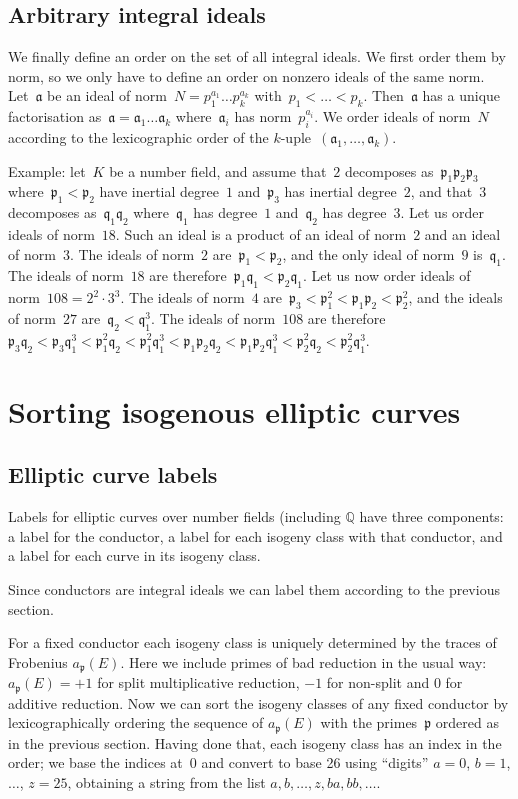 \documentclass{article}
\def\Q{{\mathbb Q}}
\def\a{{\mathfrak a}}
\def\p{{\mathfrak p}}
\def\q{{\mathfrak q}}
\begin{document}
\subsection{Arbitrary integral ideals}

We finally define an order on the set of all integral ideals. We first order
them by norm, so we only have to define an order on nonzero ideals of the same
norm. Let~$\a$ be an ideal of norm~$N = p_1^{a_1}\dots p_k^{a_k}$ with~$p_1 <
\dots < p_k$. Then~$\a$ has a unique factorisation as~$\a = \a_1\dots\a_k$
where~$\a_i$ has norm~$p_i^{a_i}$. We order ideals of norm~$N$ according to the
lexicographic order of the $k$-uple~$(\a_1,\dots,\a_k)$.

Example: let~$K$ be a number field, and assume that~$2$ decomposes
as~$\p_1\p_2\p_3$ where~$\p_1<\p_2$ have inertial degree~$1$ and~$\p_3$ has
inertial degree~$2$, and that~$3$ decomposes as~$\q_1\q_2$ where~$\q_1$ has
degree~$1$ and~$\q_2$ has degree~$3$. Let us order ideals of norm~$18$. Such an
ideal is a product of an ideal of norm~$2$ and an ideal of norm~$3$. The ideals
of norm~$2$ are~$\p_1 < \p_2$, and the only ideal of norm~$9$ is~$\q_1$. The
ideals of norm~$18$ are therefore~$\p_1\q_1 < \p_2\q_1$. Let us now order ideals
of norm~$108 = 2^2\cdot 3^3$. The ideals of norm~$4$ are~$\p_3 < \p_1^2 < \p_1\p_2 <
\p_2^2$, and the ideals of norm~$27$ are~$\q_2 < \q_1^3$. The ideals of
norm~$108$ are therefore~$\p_3\q_2 < \p_3\q_1^3 < \p_1^2\q_2 < \p_1^2\q_1^3 <
\p_1\p_2\q_2 < \p_1\p_2\q_1^3 < \p_2^2\q_2 < \p_2^2\q_1^3$.

\section{Sorting isogenous elliptic curves}

\subsection{Elliptic curve labels}

Labels for elliptic curves over number fields (including $\Q$ have
three components: a label for the conductor, a label for each isogeny
class with that conductor, and a label for each curve in its isogeny
class.

Since conductors are integral ideals we can label them according to
the previous section.

For a fixed conductor each isogeny class is uniquely determined by the
traces of Frobenius $a_{\p}(E)$.  Here we include primes of bad
reduction in the usual way: $a_{\p}(E)=+1$ for split multiplicative
reduction, $-1$ for non-split and $0$ for additive reduction.  Now we
can sort the isogeny classes of any fixed conductor by
lexicographically ordering the sequence of $a_{\p}(E)$ with the
primes~$\p$ ordered as in the previous section.  Having done that,
each isogeny class has an index in the order; we base the indices
at~$0$ and convert to base 26 using ``digits'' $a=0$, $b=1$, $\dots$,
$z=25$, obtaining a string from the list $a, b, \dots, z, ba, bb,
\dots$.
\end{document}
